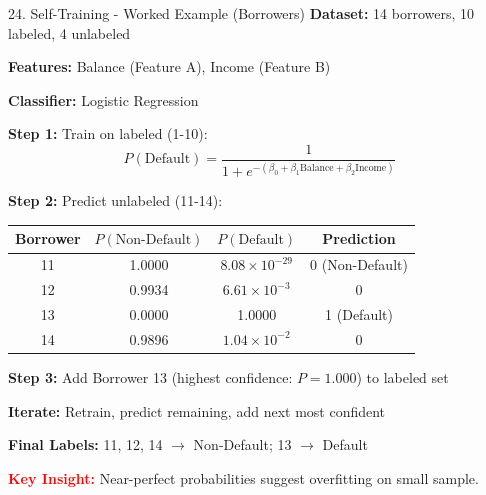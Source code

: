 \documentclass[8pt]{beamer}
\begin{document}
	\begin{frame}{24. Self-Training - Worked Example (Borrowers)}
		\fontsize{6.5}{7.5}\selectfont
		\textbf{Dataset:} 14 borrowers, 10 labeled, 4 unlabeled
		
		\textbf{Features:} Balance (Feature A), Income (Feature B)
		
		\textbf{Classifier:} Logistic Regression
		
		\textbf{Step 1:} Train on labeled (1-10):
		\[
		P(\text{Default}) = \frac{1}{1 + e^{-(\beta_0 + \beta_1 \text{Balance} + \beta_2 \text{Income})}}
		\]
		
		\textbf{Step 2:} Predict unlabeled (11-14):
		
		\begin{tabular}{|c|c|c|c|}
			\hline
			Borrower & $P(\text{Non-Default})$ & $P(\text{Default})$ & Prediction \\
			\hline
			11 & 1.0000 & $8.08 \times 10^{-29}$ & 0 (Non-Default) \\
			12 & 0.9934 & $6.61 \times 10^{-3}$ & 0 \\
			13 & 0.0000 & 1.0000 & 1 (Default) \\
			14 & 0.9896 & $1.04 \times 10^{-2}$ & 0 \\
			\hline
		\end{tabular}
		
		\textbf{Step 3:} Add Borrower 13 (highest confidence: $P=1.000$) to labeled set
		
		\textbf{Iterate:} Retrain, predict remaining, add next most confident
		
		\textbf{Final Labels:} 11, 12, 14 $\rightarrow$ Non-Default; 13 $\rightarrow$ Default
		
		\textcolor{red}{\textbf{Key Insight:}} Near-perfect probabilities suggest overfitting on small sample.
	\end{frame}
	
\end{document}
